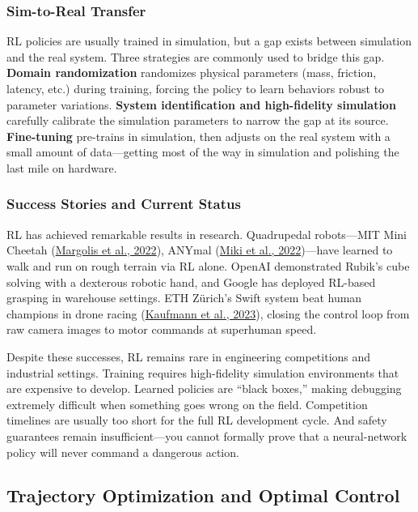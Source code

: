\subsubsection{Sim-to-Real Transfer}

RL policies are usually trained in simulation, but a gap exists between simulation and the real system. Three strategies are commonly used to bridge this gap. \textbf{Domain randomization} randomizes physical parameters (mass, friction, latency, etc.) during training, forcing the policy to learn behaviors robust to parameter variations. \textbf{System identification and high-fidelity simulation} carefully calibrate the simulation parameters to narrow the gap at its source. \textbf{Fine-tuning} pre-trains in simulation, then adjusts on the real system with a small amount of data---getting most of the way in simulation and polishing the last mile on hardware.

\subsubsection{Success Stories and Current Status}

RL has achieved remarkable results in research. Quadrupedal robots---MIT Mini Cheetah (\href{https://arxiv.org/abs/2208.07855}{Margolis et al., 2022}), ANYmal (\href{https://arxiv.org/abs/2109.11978}{Miki et al., 2022})---have learned to walk and run on rough terrain via RL alone. OpenAI demonstrated Rubik's cube solving with a dexterous robotic hand, and Google has deployed RL-based grasping in warehouse settings. ETH Z\"urich's Swift system beat human champions in drone racing (\href{https://arxiv.org/abs/2310.08984}{Kaufmann et al., 2023}), closing the control loop from raw camera images to motor commands at superhuman speed.

Despite these successes, RL remains rare in engineering competitions and industrial settings. Training requires high-fidelity simulation environments that are expensive to develop. Learned policies are ``black boxes,'' making debugging extremely difficult when something goes wrong on the field. Competition timelines are usually too short for the full RL development cycle. And safety guarantees remain insufficient---you cannot formally prove that a neural-network policy will never command a dangerous action.

\subsection{Trajectory Optimization and Optimal Control}

